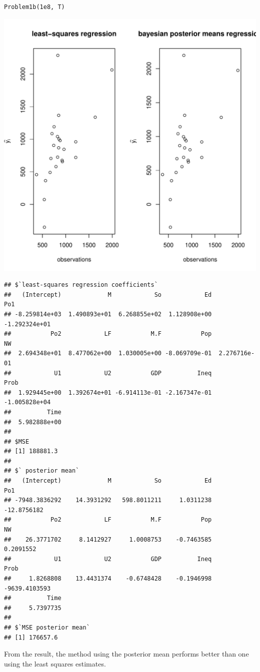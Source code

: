 \documentclass{article}\usepackage[]{graphicx}\usepackage[]{color}
\makeatletter
\newenvironment{kframe}{%
 \def\at@end@of@kframe{}%
 \ifinner\ifhmode%
  \def\at@end@of@kframe{\end{minipage}}%
  \begin{minipage}{\columnwidth}%
 \fi\fi%
 \def\FrameCommand##1{\hskip\@totalleftmargin \hskip-\fboxsep
 \colorbox{shadecolor}{##1}\hskip-\fboxsep
     \hskip-\linewidth \hskip-\@totalleftmargin \hskip\columnwidth}%
 \MakeFramed {\advance\hsize-\width
   \@totalleftmargin\z@ \linewidth\hsize
   \@setminipage}}%
 {\par\unskip\endMakeFramed%
 \at@end@of@kframe}
\newenvironment{knitrout}{}{} %
\makeatother
\begin{document}
\begin{knitrout}
\begin{kframe}
\begin{verbatim}
Problem1b(1e8, T)
\end{verbatim}
\end{kframe}
\includegraphics[width=1\linewidth]{figure/unnamed-chunk-7-1} 
\begin{kframe}\begin{verbatim}
## $`least-squares regression coefficients`
##   (Intercept)             M            So            Ed           Po1 
## -8.259814e+03  1.490893e+01  6.268855e+02  1.128908e+00 -1.292324e+01 
##           Po2            LF           M.F           Pop            NW 
##  2.694348e+01  8.477062e+00  1.030005e+00 -8.069709e-01  2.276716e-01 
##            U1            U2           GDP          Ineq          Prob 
##  1.929445e+00  1.392674e+01 -6.914113e-01 -2.167347e-01 -1.005828e+04 
##          Time 
##  5.982888e+00 
## 
## $MSE
## [1] 188881.3
## 
## $` posterior mean`
##   (Intercept)             M            So            Ed           Po1 
## -7948.3836292    14.3931292   598.8011211     1.0311238   -12.8756182 
##           Po2            LF           M.F           Pop            NW 
##    26.3771702     8.1412927     1.0008753    -0.7463585     0.2091552 
##            U1            U2           GDP          Ineq          Prob 
##     1.8268808    13.4431374    -0.6748428    -0.1946998 -9639.4103593 
##          Time 
##     5.7397735 
## 
## $`MSE posterior mean`
## [1] 176657.6
\end{verbatim}
\end{kframe}
\end{knitrout}
From the result, the method using the posterior mean performs better than one using the least squares estimates. 
\end{document}
